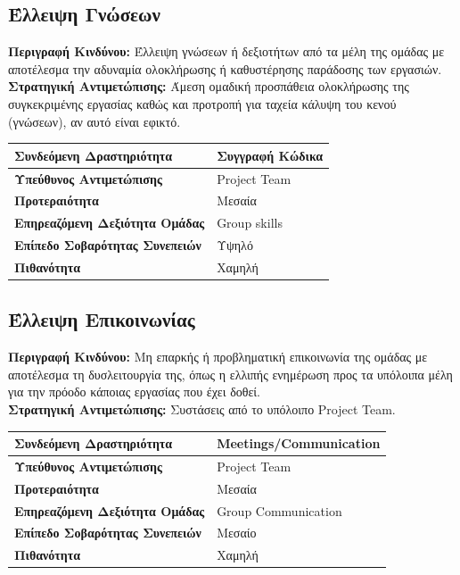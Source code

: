 \documentclass{article}
\newcommand\T{\rule{0pt}{2.6ex}}       %
\newcommand\B{\rule[-1.2ex]{0pt}{0pt}}
\begin{document}
 \newpage
 
 \subsection{Έλλειψη Γνώσεων}
 
\textbf{Περιγραφή Κινδύνου:}  Έλλειψη γνώσεων ή δεξιοτήτων από τα μέλη της ομάδας με αποτέλεσμα την αδυναμία ολοκλήρωσης ή καθυστέρησης παράδοσης των εργασιών.\\

\textbf{Στρατηγική Αντιμετώπισης:} Άμεση ομαδική προσπάθεια ολοκλήρωσης της συγκεκριμένης εργασίας καθώς και προτροπή για ταχεία κάλυψη του κενού (γνώσεων), αν αυτό είναι εφικτό.
  
   \begin{center}
     \begin{tabular}{|l|l|}
     \hline
      \textbf{Συνδεόμενη Δραστηριότητα}  & Συγγραφή Κώδικα \T\B \\ 
      \hline
      \textbf{Υπεύθυνος Αντιμετώπισης} & Project Team \T\B \\
      \hline
      \textbf{Προτεραιότητα} & Μεσαία \T\B \\
      \hline
      \textbf{Επηρεαζόμενη Δεξιότητα Ομάδας} & Group skills\T\B \\
      \hline
      \textbf{Επίπεδο Σοβαρότητας Συνεπειών} & Υψηλό \T\B \\
      \hline
      \textbf{Πιθανότητα} & Χαμηλή \T\B \\
      \hline
     \end{tabular}
 \end{center}
 
 
 \subsection{Έλλειψη Επικοινωνίας}
 
\textbf{Περιγραφή Κινδύνου:} Μη επαρκής ή προβληματική επικοινωνία της ομάδας με αποτέλεσμα τη δυσλειτουργία της, όπως η ελλιπής ενημέρωση προς τα υπόλοιπα μέλη για την πρόοδο κάποιας εργασίας που έχει δοθεί.\\
 
\textbf{Στρατηγική Αντιμετώπισης:} Συστάσεις από το υπόλοιπο Project Team.
 
  \begin{center}
     \begin{tabular}{|l|l|}
     \hline
      \textbf{Συνδεόμενη Δραστηριότητα} & Meetings/Communication \T\B \\ 
      \hline
      \textbf{Υπεύθυνος Αντιμετώπισης} & Project Team \T\B \\
      \hline
      \textbf{Προτεραιότητα} & Μεσαία \T\B \\
      \hline
      \textbf{Επηρεαζόμενη Δεξιότητα Ομάδας} & Group Communication \T\B \\
      \hline
      \textbf{Επίπεδο Σοβαρότητας Συνεπειών} & Μεσαίο \T\B \\
      \hline
      \textbf{Πιθανότητα} & Χαμηλή \T\B \\
      \hline
     \end{tabular}
 \end{center}
\end{document}
